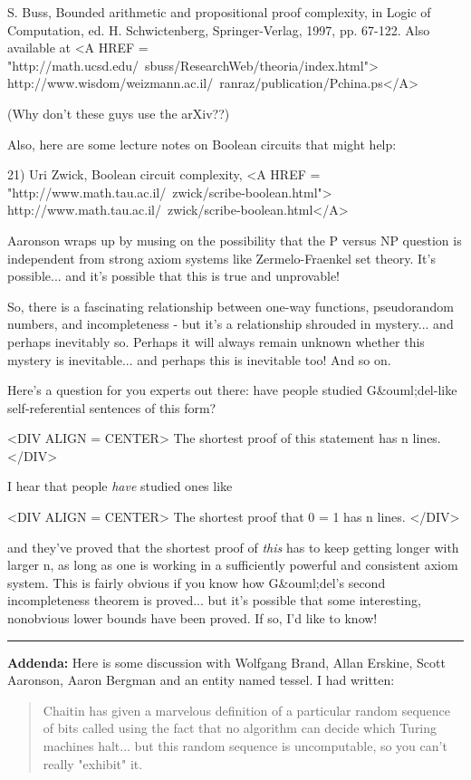 S. Buss, Bounded arithmetic and propositional proof complexity,
in Logic of Computation, ed. H. Schwictenberg, Springer-Verlag, 1997,
pp. 67-122.  Also available at 
<A HREF = "http://math.ucsd.edu/~sbuss/ResearchWeb/theoria/index.html">
http://www.wisdom/weizmann.ac.il/~ranraz/publication/Pchina.ps</A>

(Why don't these guys use the arXiv??)  

Also, here are some lecture notes on Boolean circuits that might help:

21) Uri Zwick, Boolean circuit complexity, 
<A HREF = "http://www.math.tau.ac.il/~zwick/scribe-boolean.html">
http://www.math.tau.ac.il/~zwick/scribe-boolean.html</A>

Aaronson wraps up by musing on the possibility that the P versus NP 
question is independent from strong axiom systems like Zermelo-Fraenkel 
set theory.  It's possible... and it's possible that this is true and
unprovable!

So, there is a fascinating relationship between one-way functions, 
pseudorandom numbers, and incompleteness - but it's a relationship 
shrouded in mystery... and perhaps inevitably so.  Perhaps it will
always remain unknown whether this mystery is inevitable... and perhaps 
this is inevitable too!  And so on.

Here's a question for you experts out there: have people studied G&ouml;del-like
self-referential sentences of this form?

<DIV ALIGN = CENTER>
             The shortest proof of this statement has n lines.
</DIV>

I hear that people \emph{have} studied ones like 

<DIV ALIGN = CENTER>
              The shortest proof that 0 = 1 has n lines.
</DIV>

and they've proved that the shortest proof of \emph{this} has to keep getting 
longer with larger n, as long as one is working in a sufficiently powerful
and consistent axiom system.  This is fairly obvious if you know how
G&ouml;del's second incompleteness theorem is proved... but it's possible that
some interesting, nonobvious lower bounds have been proved.  If so, I'd
like to know!

\par\noindent\rule{\textwidth}{0.4pt}
\textbf{Addenda:}
Here is some discussion with Wolfgang Brand, Allan Erskine, 
Scott Aaronson, Aaron Bergman and an entity named tessel.  I had written:

\begin{quote}
Chaitin has given a marvelous definition of a 
particular random sequence of bits called \Omega  using the fact that no 
algorithm can decide which Turing machines halt... but this random 
sequence is uncomputable, so you can't really "exhibit" it.
\end{quote}

